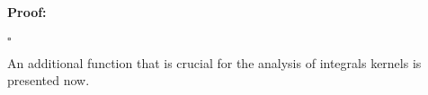 \documentclass{article}
\newenvironment{proof}{\paragraph{Proof:}}{\hfill$\square$}
\newcommand{\IC}{{\mathbb C}}
\newcommand{\IN}{{\mathbb N}}
\newcommand{\bp}{{\bm p}}
\newcommand{\cmspace}[3]{\mathcal{C}^{#1} \left( #2, #3 \right)}
\newcommand{\bh}{\bm{h}}
\newcommand{\br}{\bm{r}}
\begin{document}
\begin{proof}
\end{proof}

An additional function that is crucial for the analysis of integrals kernels is presented now. 
\end{document}
